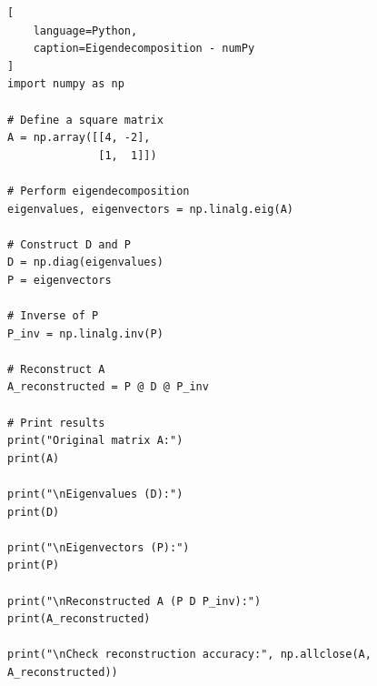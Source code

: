 \begin{lstlisting}[
    language=Python,
    caption=Eigendecomposition - numPy
]
import numpy as np

# Define a square matrix
A = np.array([[4, -2],
              [1,  1]])

# Perform eigendecomposition
eigenvalues, eigenvectors = np.linalg.eig(A)

# Construct D and P
D = np.diag(eigenvalues)
P = eigenvectors

# Inverse of P
P_inv = np.linalg.inv(P)

# Reconstruct A
A_reconstructed = P @ D @ P_inv

# Print results
print("Original matrix A:")
print(A)

print("\nEigenvalues (D):")
print(D)

print("\nEigenvectors (P):")
print(P)

print("\nReconstructed A (P D P_inv):")
print(A_reconstructed)

print("\nCheck reconstruction accuracy:", np.allclose(A, A_reconstructed))
\end{lstlisting}






